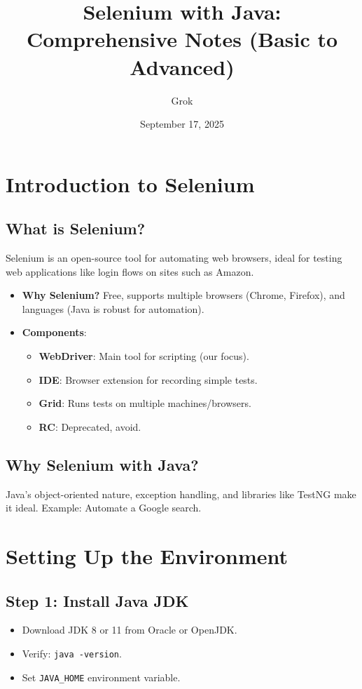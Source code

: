 \documentclass[a4paper,12pt]{article}
\title{Selenium with Java: Comprehensive Notes (Basic to Advanced)}
\author{Grok}
\date{September 17, 2025}
\begin{document}
\maketitle
\tableofcontents
\newpage

\section{Introduction to Selenium}

\subsection{What is Selenium?}
Selenium is an open-source tool for automating web browsers, ideal for testing web applications like login flows on sites such as Amazon.

\begin{itemize}
    \item \textbf{Why Selenium?} Free, supports multiple browsers (Chrome, Firefox), and languages (Java is robust for automation).
    \item \textbf{Components}:
    \begin{itemize}
        \item \textbf{WebDriver}: Main tool for scripting (our focus).
        \item \textbf{IDE}: Browser extension for recording simple tests.
        \item \textbf{Grid}: Runs tests on multiple machines/browsers.
        \item \textbf{RC}: Deprecated, avoid.
    \end{itemize}
\end{itemize}

\subsection{Why Selenium with Java?}
Java’s object-oriented nature, exception handling, and libraries like TestNG make it ideal. Example: Automate a Google search.

\section{Setting Up the Environment}

\subsection{Step 1: Install Java JDK}
\begin{itemize}
    \item Download JDK 8 or 11 from Oracle or OpenJDK.
    \item Verify: \texttt{java -version}.
    \item Set \texttt{JAVA\_HOME} environment variable.
\end{itemize}
\end{document}

